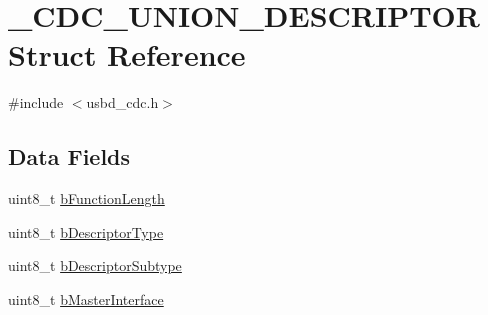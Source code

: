 \hypertarget{struct__CDC__UNION__DESCRIPTOR}{\section{\-\_\-\-C\-D\-C\-\_\-\-U\-N\-I\-O\-N\-\_\-\-D\-E\-S\-C\-R\-I\-P\-T\-O\-R Struct Reference}
\label{struct__CDC__UNION__DESCRIPTOR}
}


{\ttfamily \#include $<$usbd\-\_\-cdc.\-h$>$}

\subsection*{Data Fields}
\begin{DoxyCompactItemize}
\item 
uint8\-\_\-t \hyperlink{struct__CDC__UNION__DESCRIPTOR_a1dfd18183a0989b8631c11b718ce3819}{b\-Function\-Length}
\item 
uint8\-\_\-t \hyperlink{struct__CDC__UNION__DESCRIPTOR_a605016c2bd378f5dd95533edf130b4c9}{b\-Descriptor\-Type}
\item 
uint8\-\_\-t \hyperlink{struct__CDC__UNION__DESCRIPTOR_a5d9d4e51f6313dd40d479cbd688b8c8d}{b\-Descriptor\-Subtype}
\item 
uint8\-\_\-t \hyperlink{struct__CDC__UNION__DESCRIPTOR_aaa7e80367c520e1fc09a73f336df048e}{b\-Master\-Interface}
\end{DoxyCompactItemize}


